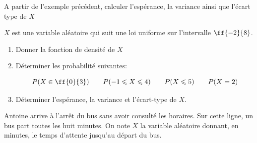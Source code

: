 \documentclass[a4paper,12pt,openany]{book}
\begin{document}

\bigskip

\exer \qquad A partir de l'exemple précédent, calculer l'espérance, la variance ainsi que l'écart type de $X$

\newpage

\exer $X$ est une variable aléatoire qui suit une loi uniforme sur l'intervalle $\ff{-2}{8}$.

\begin{enumerate}
	\item Donner la fonction de densité de $X$ \\
	
	\item Déterminer les probabilité suivantes:
	
	$$P(X  \in \ff{0}{3}) \qquad P(-1\leqslant X \leqslant 4) \qquad P(X\leqslant 5)  \qquad P(X=2)$$
	
	\vspace{4cm}
	
	\item Déterminer l'espérance, la variance et l'écart-type de $X$.
	
	\vspace{3cm}
	
	
\end{enumerate}

\bigskip

\exer Antoine arrive à l'arrêt du bus sans avoir consulté les horaires. Sur cette ligne, un bus part toutes les huit minutes. On note $X$ la variable aléatoire donnant, en minutes, le temps d'attente jusqu'au départ du bus.
\end{document}
